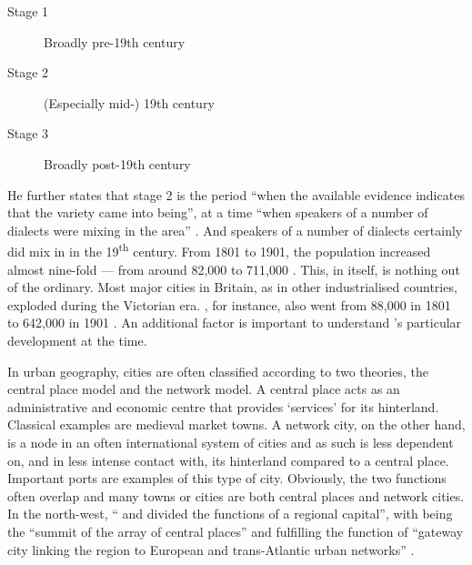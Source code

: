 	\begin{description}
		\item[Stage 1] Broadly pre-19th century
		\item[Stage 2] (Especially mid-) 19th century
		\item[Stage 3] Broadly post-19th century
	\end{description}

He further states that stage 2 is the period ``when the available evidence indicates that the variety came into being'', at a time ``when speakers of a number of dialects were mixing in the area'' \parencite[106--107]{honeybone2007}.
And speakers of a number of dialects certainly did mix in  in the 19\textsuperscript{th} century.
From 1801 to 1901, the population increased almost nine-fold --- from around 82,000 to 711,000 \parencite{gbhistgis}.
This, in itself, is nothing out of the ordinary.
Most major cities in Britain, as in other industrialised countries, exploded during the Victorian era.
, for instance, also went from 88,000 in 1801 to 642,000 in 1901 \parencite{gbhistgis}.
An additional factor is important to understand 's particular development at the time.

In urban geography, cities are often classified according to two theories, the central place model and the network model.
A central place acts as an administrative and economic centre that provides `services' for its hinterland. Classical examples are medieval market towns.
A network city, on the other hand, is a node in an often international system of cities and as such is less dependent on, and in less intense contact with, its hinterland compared to a central place.
Important ports are  examples of this type of city.
Obviously, the two functions often overlap and many towns or cities are both central places and network cities.
In the north-west, `` and  divided the functions of a regional capital'', with  being the ``summit of the array of central places'' and  fulfilling the function of ``gateway city linking the region to European and trans-Atlantic urban networks'' \citep[188--189]{hohenberglees1985}.

